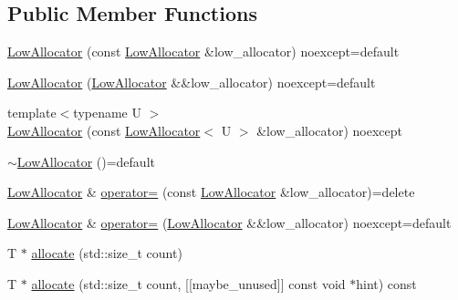 \subsection*{Public Member Functions}
\begin{DoxyCompactItemize}
\item 
\mbox{\hyperlink{classmage_1_1_double_ended_memory_stack_1_1_low_allocator_aae78b9e9c97d6a4dbd234cfb52d4059d}{Low\+Allocator}} (const \mbox{\hyperlink{classmage_1_1_double_ended_memory_stack_1_1_low_allocator}{Low\+Allocator}} \&low\+\_\+allocator) noexcept=default
\item 
\mbox{\hyperlink{classmage_1_1_double_ended_memory_stack_1_1_low_allocator_aa60a12ecd37a8b586c718de9cb0e21b0}{Low\+Allocator}} (\mbox{\hyperlink{classmage_1_1_double_ended_memory_stack_1_1_low_allocator}{Low\+Allocator}} \&\&low\+\_\+allocator) noexcept=default
\item 
{\footnotesize template$<$typename U $>$ }\\\mbox{\hyperlink{classmage_1_1_double_ended_memory_stack_1_1_low_allocator_a51363b1e806c3ad9753aae67d0bfc635}{Low\+Allocator}} (const \mbox{\hyperlink{classmage_1_1_double_ended_memory_stack_1_1_low_allocator}{Low\+Allocator}}$<$ U $>$ \&low\+\_\+allocator) noexcept
\item 
\mbox{\hyperlink{classmage_1_1_double_ended_memory_stack_1_1_low_allocator_aa049f2291b58ff196b987adf126f0906}{$\sim$\+Low\+Allocator}} ()=default
\item 
\mbox{\hyperlink{classmage_1_1_double_ended_memory_stack_1_1_low_allocator}{Low\+Allocator}} \& \mbox{\hyperlink{classmage_1_1_double_ended_memory_stack_1_1_low_allocator_a709076f9dc2e900814039cecd145d32a}{operator=}} (const \mbox{\hyperlink{classmage_1_1_double_ended_memory_stack_1_1_low_allocator}{Low\+Allocator}} \&low\+\_\+allocator)=delete
\item 
\mbox{\hyperlink{classmage_1_1_double_ended_memory_stack_1_1_low_allocator}{Low\+Allocator}} \& \mbox{\hyperlink{classmage_1_1_double_ended_memory_stack_1_1_low_allocator_a5cdfc73e8f91ec41f5efa3499141f3b3}{operator=}} (\mbox{\hyperlink{classmage_1_1_double_ended_memory_stack_1_1_low_allocator}{Low\+Allocator}} \&\&low\+\_\+allocator) noexcept=default
\item 
T $\ast$ \mbox{\hyperlink{classmage_1_1_double_ended_memory_stack_1_1_low_allocator_a184d2d8484fe5c462b42c18a1d1927e0}{allocate}} (std\+::size\+\_\+t count)
\item 
T $\ast$ \mbox{\hyperlink{classmage_1_1_double_ended_memory_stack_1_1_low_allocator_aa18d91070651bab5db81194ac7b53ba5}{allocate}} (std\+::size\+\_\+t count, \mbox{[}\mbox{[}maybe\+\_\+unused\mbox{]}\mbox{]} const void $\ast$hint) const

\end{DoxyCompactItemize}
